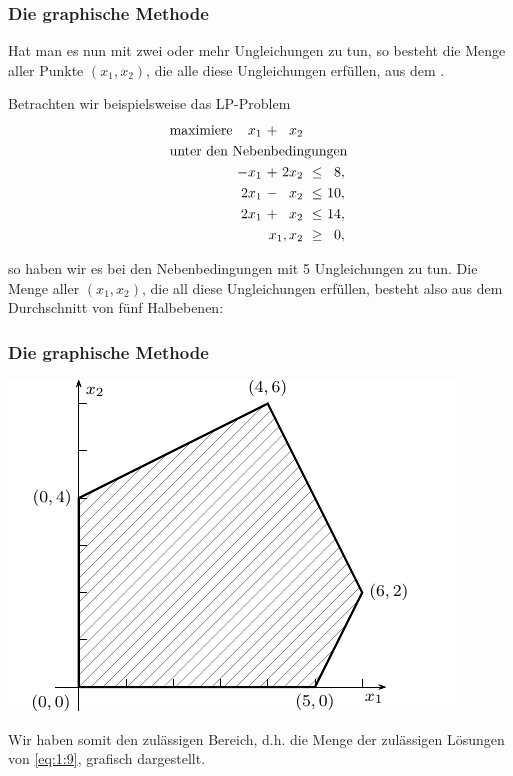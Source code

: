 \documentclass[smaller]{beamer}
\begin{document}
\begin{frame}
 \frametitle{Die graphische Methode}
 Hat man es nun mit zwei oder mehr Ungleichungen zu tun, so besteht die Menge aller Punkte $(x_1,x_2)$, die alle diese Ungleichungen erfüllen, aus dem .

Betrachten wir beispielsweise das LP-Problem
\begin{align}
\begin{alignedat}{4}
\label{eq:1:9}
& \text{maximiere } & x_1 &\ + &\ x_2 & & \\
& \rlap{unter den Nebenbedingungen} & & & & & \\
&& -x_1 &\ + &\ 2x_2 &\ \leq &\  8,\ \\
&& 2x_1 &\ - &\  x_2 &\ \leq &\ 10,\ \\
&& 2x_1 &\ + &\  x_2 &\ \leq &\ 14,\ \\
&& & & \llap{$x_1, x_2$} &\ \geq &\ 0,\ 
\end{alignedat}
\end{align}

so haben wir es bei den Nebenbedingungen mit 5 Ungleichungen zu tun. Die Menge aller $(x_1,x_2)$, die all diese Ungleichungen erfüllen, besteht also aus dem Durchschnitt von fünf Halbebenen:
\end{frame}

\begin{frame}
 \frametitle{Die graphische Methode}
 \begin{center}
\includegraphics{fig2.pdf}
\end{center}
Wir haben somit den zulässigen Bereich, d.h. die Menge der zulässigen Lösungen von \eqref{eq:1:9}, grafisch dargestellt.
\end{frame}
\end{document}
